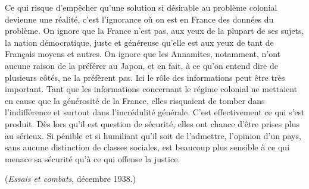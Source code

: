 \documentclass[french,twoside]{book} %
\begin{document}
Ce qui risque d'empêcher qu'une solution si désirable au problème colonial devienne une réalité, c'est l'ignorance où on est en France des données du problème. On ignore que la France n'est pas, aux yeux de la plupart de ses sujets, la nation démocratique, juste et généreuse qu'elle est aux yeux de tant de Français moyens et autres. On ignore que les Annamites, notamment, n'ont aucune raison de la préférer au Japon, et en fait, à ce qu'on entend dire de plusieurs côtés, ne la préfèrent pas. Ici le rôle des informations peut être très important. Tant que les informations concernant le régime colonial ne mettaient en cause que la générosité de la France, elles risquaient de tomber dans l'indifférence et surtout dans l'incrédulité générale. C'est effectivement ce qui s'est produit. Dès lors qu'il est question de sécurité, elles ont chance d'être prises plus au sérieux. Si pénible et si humiliant qu'il soit de l'admettre, l'opinion d'un pays, sans aucune distinction de classes sociales, est beaucoup plus sensible à ce qui menace sa sécurité qu'à ce qui offense la justice.\par
({\itshape Essais et combats}, décembre 1938.)\par
\end{document}
